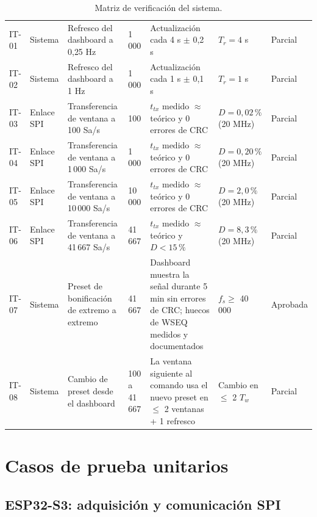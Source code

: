 \documentclass[12pt,a4paper]{article}
\begin{document}
\begin{table}[H]
\begin{tabular}{@{}p{1.3cm} p{1.7cm} p{3.3cm} p{1.7cm} p{3.0cm} p{2.5cm} p{1.4cm}@{}}
IT-01 & Sistema & Refresco del dashboard a 0{,}25 Hz & 1\,000 & Actualización cada 4 s $\pm$ 0{,}2 s & $T_r = 4$ s & Parcial \\
IT-02 & Sistema & Refresco del dashboard a 1 Hz & 1\,000 & Actualización cada 1 s $\pm$ 0{,}1 s & $T_r = 1$ s & Parcial \\
IT-03 & Enlace SPI & Transferencia de ventana a 100 Sa/s & 100 & $t_{tx}$ medido $\approx$ teórico y 0 errores de CRC & $D = 0{,}02\,\%$ (20 MHz) & Parcial \\
IT-04 & Enlace SPI & Transferencia de ventana a 1\,000 Sa/s & 1\,000 & $t_{tx}$ medido $\approx$ teórico y 0 errores de CRC & $D = 0{,}20\,\%$ (20 MHz) & Parcial \\
IT-05 & Enlace SPI & Transferencia de ventana a 10\,000 Sa/s & 10\,000 & $t_{tx}$ medido $\approx$ teórico y 0 errores de CRC & $D = 2{,}0\,\%$ (20 MHz) & Parcial \\
IT-06 & Enlace SPI & Transferencia de ventana a 41\,667 Sa/s & 41\,667 & $t_{tx}$ medido $\approx$ teórico y $D < 15\,\%$ & $D = 8{,}3\,\%$ (20 MHz) & Parcial \\
IT-07 & Sistema & Preset de bonificación de extremo a extremo & 41\,667 & Dashboard muestra la señal durante 5 min sin errores de CRC; huecos de WSEQ medidos y documentados & $f_s \geq$ 40\,000 & Aprobada \\
IT-08 & Sistema & Cambio de preset desde el dashboard & 100 a 41\,667 & La ventana siguiente al comando usa el nuevo preset en $\leq$ 2 ventanas + 1 refresco & Cambio en $\leq$ 2 $T_w$ & Parcial \\
\bottomrule
\end{tabular}
\caption{Matriz de verificación del sistema.}
\label{tab:matriz}
\end{table}

\section{Casos de prueba unitarios}

\subsection{ESP32-S3: adquisición y comunicación SPI}
\end{document}
